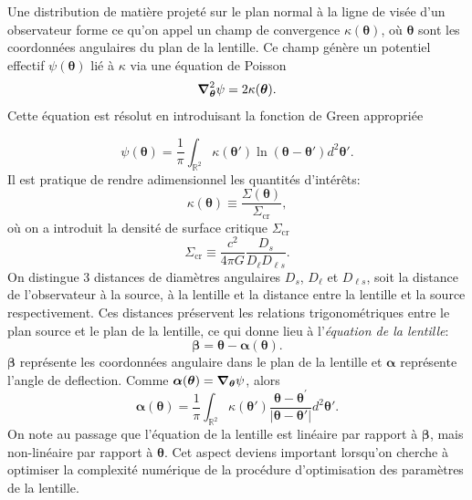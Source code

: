 \documentclass[times,10pt,twocolumn]{article}
\begin{document}
Une distribution de matière projeté sur le plan normal à la ligne de visée d'un 
observateur forme ce qu'on 
appel un champ de convergence $\kappa(\boldsymbol{\theta})$, où $\boldsymbol{\theta}$ sont 
les coordonnées angulaires du plan de la lentille. Ce champ génère un potentiel 
effectif $\psi(\boldsymbol{\theta})$ lié à $\kappa$ via une équation de Poisson
\begin{equation}\label{eq:Poisson} 
        \grad^{2}_{\boldsymbol{\theta}} \psi = 2 \kappa(\boldsymbol{\theta} ).
\end{equation} 
Cette équation est résolut en introduisant la fonction de Green appropriée

\begin{equation}\label{eq:Potentiel} 
        \psi(\boldsymbol{ \theta}) = \frac{1}{\pi} \int_{\mathbb{R}^2} 
        \kappa(\boldsymbol{ \theta}') \ln(\boldsymbol{\theta} - \boldsymbol{\theta}') d^2\boldsymbol{\theta}'.
\end{equation}
Il est pratique de rendre adimensionnel les quantités d'intérêts:
\begin{equation}\label{eq:Convergence} 
        \kappa(\boldsymbol{\theta}) \equiv \frac{\Sigma(\boldsymbol{\theta})}{\Sigma_{\mathrm{cr}}},
\end{equation} 
où on a introduit la densité de surface critique $\Sigma_{\mathrm{cr}}$
\begin{equation}\label{eq:Sigcritique} 
        \Sigma_{\mathrm{cr}} \equiv \frac{c^2}{4\pi G} \frac{D_s}{D_\ell D_{\ell s}}.
\end{equation}
On distingue 3 distances de diamètres angulaires $D_s$, $D_\ell$ et $D_{\ell s}$, 
soit la distance de l'observateur à la source, à la lentille et la distance 
entre la lentille et la source respectivement. Ces distances préservent les relations 
trigonométriques entre le plan source et le plan de la lentille, ce qui donne 
lieu à l'\textit{équation de la lentille}:
\begin{equation}\label{eq:LensEquation} 
        \boldsymbol{\beta} = \boldsymbol{\theta} - \boldsymbol{\alpha}(\boldsymbol{\theta}).
\end{equation} 
$\boldsymbol{\beta}$ représente les coordonnées angulaire dans le plan de la lentille et 
$\boldsymbol{\alpha}$ représente l'angle de deflection. Comme 
$\boldsymbol{\alpha}(\boldsymbol{\theta}) = \grad_{\boldsymbol{\theta}} \psi$, alors
\begin{equation}\label{eq:DeflectionAngle} 
        \boldsymbol{\alpha}(\boldsymbol{\theta}) = \frac{1}{\pi} \int_{\mathbb{R}^{2}} \kappa(\boldsymbol{\theta}')
        \frac{\boldsymbol{\theta} - \boldsymbol{\theta}^{'}}{|\boldsymbol{\theta} - \boldsymbol{\theta}'|}
        d^{2}\boldsymbol{\theta}'.
\end{equation} 
On note 
au passage que l'équation de la lentille est linéaire par rapport à $\boldsymbol{\beta}$, 
mais non-linéaire par rapport à $\boldsymbol{\theta}$. Cet aspect deviens important lorsqu'on 
cherche à optimiser la complexité numérique de la procédure d'optimisation des paramètres de la 
lentille. \par
\end{document}
